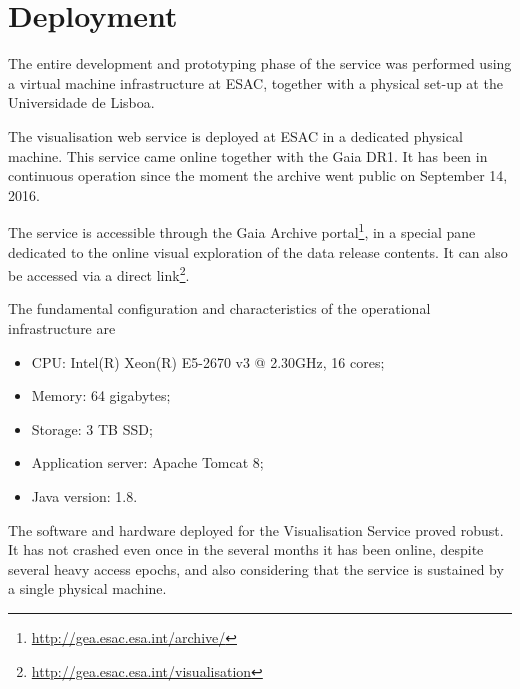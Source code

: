 \documentclass[longauth, final]{aa}
\def\red#1{\textcolor{red}{#1}}
\begin{document}
\section{Deployment}
\label{sec:deploy}

The entire development and prototyping phase of the service was performed using a virtual machine infrastructure at ESAC, together with a physical set-up at the Universidade de Lisboa. 


The visualisation web service is deployed at ESAC in a dedicated physical machine. This service came online together with the Gaia DR1. It has been in continuous operation since the moment the archive went public on September 14, 2016.

The service is accessible through the Gaia Archive portal\footnote{\url{http://gea.esac.esa.int/archive/}}, in a special pane dedicated to the online visual exploration of the data release contents. It can also be accessed via a direct link\footnote{\url{http://gea.esac.esa.int/visualisation}}.

 
The fundamental configuration and characteristics of the operational infrastructure are

\begin{itemize}
\item CPU: Intel(R) Xeon(R) E5-2670 v3 @ 2.30GHz, 16 cores;
\item Memory: 64 gigabytes;
\item Storage: 3 TB SSD;
\item Application server: Apache Tomcat 8;
\item Java version: 1.8.
\end{itemize}

The software and hardware deployed for the Visualisation Service proved robust. It has not crashed even once in the several months it has been online, despite several heavy access epochs, and also considering that the service is sustained by a single physical machine.
\end{document}
